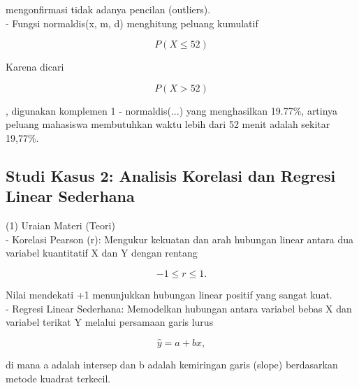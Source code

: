 \documentclass{article}
\newenvironment{eulernotebook}{\par}{\par}
\newcommand{\eulersubheading}[1]{\subsection{#1}}
\newenvironment{eulercomment}{\par\medskip}{\par\medskip}
\newenvironment{eulerformula}{}{}
\begin{document}
\begin{eulernotebook}
\begin{eulercomment}
\begin{eulercomment}
\begin{eulercomment}
\begin{eulercomment}
\begin{eulercomment}
\begin{eulercomment}
\begin{eulercomment}
mengonfirmasi tidak adanya pencilan (outliers).\\
- Fungsi normaldis(x, m, d) menghitung peluang kumulatif\\
\end{eulercomment}
\begin{eulerformula}
\[
P(X \le 52)
\]
\end{eulerformula}
\begin{eulercomment}
Karena dicari\\
\end{eulercomment}
\begin{eulerformula}
\[
P(X > 52)
\]
\end{eulerformula}
\begin{eulercomment}
, digunakan komplemen 1 - normaldis(...) yang menghasilkan 19.77\%,
artinya peluang mahasiswa membutuhkan waktu lebih dari 52 menit adalah
sekitar 19,77\%.

\end{eulercomment}
\eulersubheading{Studi Kasus 2: Analisis Korelasi dan Regresi Linear Sederhana}
\begin{eulercomment}
(1) Uraian Materi (Teori)\\
- Korelasi Pearson (r): Mengukur kekuatan dan arah hubungan linear
antara dua variabel kuantitatif X dan Y dengan rentang\\
\end{eulercomment}
\begin{eulerformula}
\[
-1 \le r \le 1.
\]
\end{eulerformula}
\begin{eulercomment}
Nilai mendekati +1 menunjukkan hubungan linear positif yang sangat
kuat.\\
- Regresi Linear Sederhana: Memodelkan hubungan antara variabel bebas
X dan variabel terikat Y melalui persamaan garis lurus\\
\end{eulercomment}
\begin{eulerformula}
\[
\hat{y} = a + bx,
\]
\end{eulerformula}
\begin{eulercomment}
di mana a adalah intersep dan b adalah kemiringan garis (slope)
berdasarkan metode kuadrat terkecil.


\end{eulercomment}
\end{eulercomment}
\end{eulercomment}
\end{eulercomment}
\end{eulercomment}
\end{eulercomment}
\end{eulercomment}
\end{eulernotebook}
\end{document}
